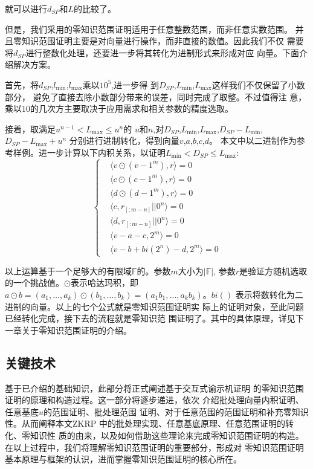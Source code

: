 \documentclass[zihao=-4]{ctexart}
\begin{document}
就可以进行$d_{SP}$和$L$的比较了。\par
但是，我们采用的零知识范围证明适用于任意整数范围，而非任意实数范围。
并且零知识范围证明主要是对向量进行操作，而非直接的数值。因此我们不仅
需要将$d_{SP}$进行整数化处理，还要进一步将其转化为进制形式来形成对应
向量。下面介绍解决方案。\par
首先，将$d_{SP}$,$l_{\min}$,$l_{\max}$乘以$10^5$,进一步得
到$D_{SP}$,$L_{\min}$,$L_{\max}$这样我们不仅保留了小数部分，
避免了直接去除小数部分带来的误差，同时完成了取整。不过值得注
意，乘以$10$的几次方主要取决于应用需求和相关参数的精度选取。\par
接着，取满足$u^{n-1}<L_{\max}\leq u^n$的
$u$和$n$,对$D_{SP}$,$L_{\min}$,$L_{\max}$,$D_{SP}-L_{\min}$,$D_{SP}-L_{\max}+u^n$
分别进行进制转化，得到向量$v$,$a$,$b$,$c$,$d$。
本文中以二进制作为参考样例。进一步计算以下内积关系，以证明$L_{\min}< D_{SP}\leq L_{\max}$:
\begin{equation}
  \begin{cases}
    &\langle v\odot(v-1^m),r\rangle=0\\
    &\langle c\odot(c-1^m),r\rangle=0\\
    &\langle d\odot(d-1^m),r\rangle=0\\
    &\langle c,r_{[:m-n]}||0^n\rangle=0\\
    &\langle d,r_{[:m-n]}||0^n\rangle=0\\
    &\langle v-a-c,2^m\rangle=0\\
    &\langle v-b+bi(2^n)-d,2^m\rangle=0
  \end{cases}
\end{equation}
\par
以上运算基于一个足够大的有限域$\mathbb{F}$的。参数$m$大小为$|\mathbb{F}|$,
参数$r$是验证方随机选取的一个挑战值。$\odot$表示哈达玛积，即
$a\odot b=(a_1,\ldots,a_k)\odot(b_1,\ldots,b_k)=(a_1b_1,\ldots,a_kb_k)$。$bi()$
表示将数转化为二进制的向量。以上的七个公式就是零知识范围证明实
际上的证明对象，至此问题已经转化完成，接下去的流程就是零知识范
围证明了。其中的具体原理，详见下一章关于零知识范围证明的介绍。


\subsection{关键技术}

基于已介绍的基础知识，此部分将正式阐述基于交互式谕示机证明
的零知识范围证明的原理和构造过程。这一部分将逐步递进，依次
介绍批处理向量内积证明、任意基底$u$的范围证明、批处理范围
证明、对于任意范围的范围证明和补充零知识性。从而阐释本文ZKRP
中的批处理实现、任意基底原理、任意范围证明的转化、零知识性
质的由来，以及如何借助这些理论来完成零知识范围证明的构造。
在以上过程中，我们将理解零知识范围证明的重要部分，形成对
零知识范围证明基本原理与框架的认识，进而掌握零知识范围证明的核心所在。
\end{document}
